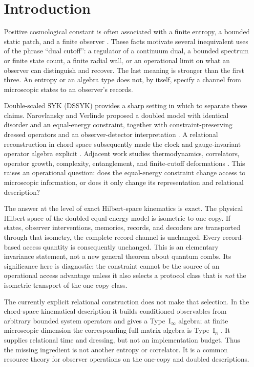 \documentclass[11pt]{article}
\begin{document}
\section{Introduction}
\label{sec:intro}

Positive cosmological constant is often associated with a finite entropy, a
bounded static patch, and a finite observer \citep{CLPW}.  These facts motivate several
inequivalent uses of the phrase ``dual cutoff'': a regulator of a continuum
dual, a bounded spectrum or finite state count, a finite radial wall, or an
operational limit on what an observer can distinguish and recover.  The last
meaning is stronger than the first three.  An entropy or an algebra type does
not, by itself, specify a channel from microscopic states to an observer's
records.

Double-scaled SYK (DSSYK) provides a sharp setting in which to separate these
claims.  Narovlansky and Verlinde proposed a doubled model with identical
disorder and an equal-energy constraint, together with constraint-preserving
dressed operators and an observer-detector interpretation
\citep{NarovlanskyVerlinde2023}.  A relational reconstruction in chord space
subsequently made the clock and gauge-invariant operator algebra explicit
\citep{AguilarRelational2025}.  Adjacent work studies thermodynamics,
correlators, operator growth, complexity, entanglement, and finite-cutoff
deformations \citep{TiettoVerlinde2025,NarovlanskyDynamics2025,
AguilarT2,AguilarFiniteCutoff}.  This raises an operational question:
does the equal-energy constraint change access to microscopic information, or
does it only change its representation and relational description?

The answer at the level of exact Hilbert-space kinematics is exact.  The
physical Hilbert space of the doubled equal-energy model is isometric to one
copy.  If states,
observer interventions, memories, records, and decoders are transported
through that isometry, the complete record channel is unchanged.  Every
record-based access quantity is consequently unchanged.  This is an
elementary invariance statement, not a new general theorem about quantum
combs.  Its significance here is diagnostic: the constraint cannot be the
source of an operational access advantage unless it also selects a protocol
class that is \emph{not} the isometric transport of the one-copy class.

The currently explicit relational construction does not make that selection.
In the chord-space kinematical description it builds conditioned observables
from arbitrary bounded system operators and gives a Type~I$_\infty$ algebra;
at finite microscopic dimension the corresponding full matrix algebra is
Type~I$_n$
\citep{AguilarRelational2025}.  It supplies relational time and dressing, but
not an implementation budget.  Thus the missing ingredient is not another
entropy or correlator.  It is a common resource theory for observer
operations on the one-copy and doubled descriptions.
\end{document}
